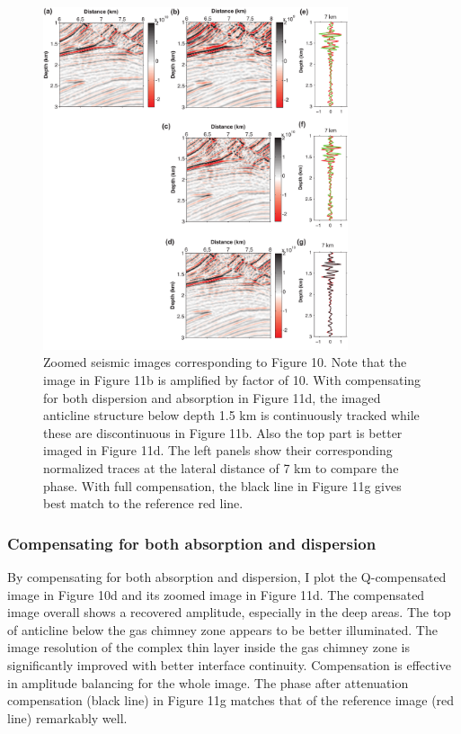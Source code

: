  \begin{figure}[!htb]
   \centering
   \includegraphics[width=0.8\textwidth]{Fig/fig11-eps-converted-to}
   \caption{Zoomed seismic images corresponding to Figure 10. Note that the image in Figure 11b is amplified by factor of 10. With compensating for both dispersion and absorption in Figure 11d, the imaged anticline structure below depth 1.5 km is continuously tracked while these are discontinuous in Figure 11b. Also the top part is better imaged in Figure 11d. The left panels show their corresponding normalized traces at the lateral distance of 7 km to compare the phase. With full compensation, the black line in Figure 11g gives best match to the reference red line.}
 \end{figure}

\subsubsection{Compensating for both absorption and dispersion}
By compensating for both absorption and dispersion, I plot the Q-compensated image in Figure 10d and its zoomed image in Figure 11d. The compensated image overall shows a recovered amplitude, especially in the deep areas. The top of anticline below the gas chimney zone appears to be better illuminated. The image resolution of the complex thin layer inside the gas chimney zone is significantly improved with better interface continuity. Compensation is effective in amplitude balancing for the whole image. The phase after attenuation compensation (black line) in Figure 11g matches that of the reference image (red line) remarkably well. 

